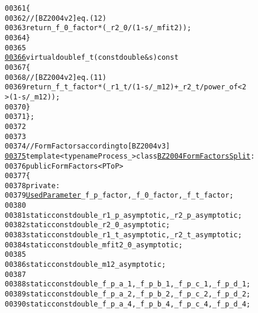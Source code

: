 \begin{footnotesize}
\begin{alltt}
00361 \textcolor{keyword}{            }\{
00362                 \textcolor{comment}{// [BZ2004v2] eq. (12)}
00363                 \textcolor{keywordflow}{return} \_f\_0\_factor * (\_r2\_0 / (1 - s / \_mfit2));
00364             \}
00365 
\hypertarget{mesonic-impl_8hh_source_l00366}{}\hyperlink{classeos_1_1BZ2004FormFactors_3_01Process___00_01PToP_01_4_a1721a47e9e515d8301e0611cb82398aa}{00366}             \textcolor{keyword}{virtual} \textcolor{keywordtype}{double} f\_t(\textcolor{keyword}{const} \textcolor{keywordtype}{double} & s)\textcolor{keyword}{ const}
00367 \textcolor{keyword}{            }\{
00368                 \textcolor{comment}{// [BZ2004v2] eq. (11)}
00369                 \textcolor{keywordflow}{return} \_f\_t\_factor * (\_r1\_t / (1 - s / \_m12) + \_r2\_t / power\_of<2
      >(1 - s / \_m12));
00370             \}
00371     \};
00372 
00373 
00374     \textcolor{comment}{// Form Factors according to [BZ2004v3]}
\hypertarget{mesonic-impl_8hh_source_l00375}{}\hyperlink{classeos_1_1BZ2004FormFactorsSplit}{00375}     \textcolor{keyword}{template} <\textcolor{keyword}{typename} Process\_> \textcolor{keyword}{class }\hyperlink{classeos_1_1BZ2004FormFactorsSplit}{BZ2004FormFactorsSplit} :
00376         \textcolor{keyword}{public} FormFactors<PToP>
00377     \{
00378         \textcolor{keyword}{private}:
00379             \hyperlink{classeos_1_1UsedParameter}{UsedParameter} \_f\_p\_factor, \_f\_0\_factor, \_f\_t\_factor;
00380 
00381             \textcolor{keyword}{static} \textcolor{keyword}{const} \textcolor{keywordtype}{double} \_r1\_p\_asymptotic, \_r2\_p\_asymptotic;
00382             \textcolor{keyword}{static} \textcolor{keyword}{const} \textcolor{keywordtype}{double} \_r2\_0\_asymptotic;
00383             \textcolor{keyword}{static} \textcolor{keyword}{const} \textcolor{keywordtype}{double} \_r1\_t\_asymptotic, \_r2\_t\_asymptotic;
00384             \textcolor{keyword}{static} \textcolor{keyword}{const} \textcolor{keywordtype}{double} \_mfit2\_0\_asymptotic;
00385 
00386             \textcolor{keyword}{static} \textcolor{keyword}{const} \textcolor{keywordtype}{double} \_m12\_asymptotic;
00387 
00388             \textcolor{keyword}{static} \textcolor{keyword}{const} \textcolor{keywordtype}{double} \_f\_p\_a\_1, \_f\_p\_b\_1, \_f\_p\_c\_1, \_f\_p\_d\_1;
00389             \textcolor{keyword}{static} \textcolor{keyword}{const} \textcolor{keywordtype}{double} \_f\_p\_a\_2, \_f\_p\_b\_2, \_f\_p\_c\_2, \_f\_p\_d\_2;
00390             \textcolor{keyword}{static} \textcolor{keyword}{const} \textcolor{keywordtype}{double} \_f\_p\_a\_4, \_f\_p\_b\_4, \_f\_p\_c\_4, \_f\_p\_d\_4;

\end{alltt}
\end{footnotesize}

